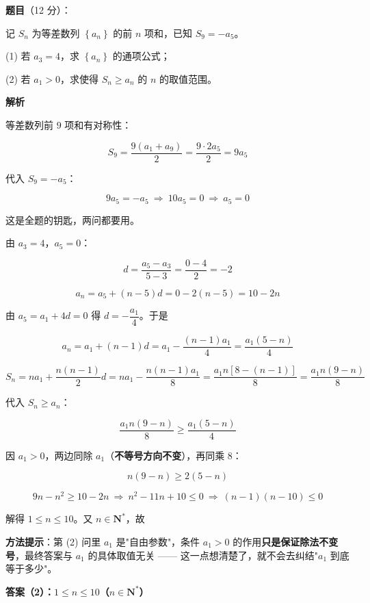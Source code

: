 \begin{answer}

\textbf{题目}（12 分）：

记 $S_n$ 为等差数列 $\left\{a_n\right\}$ 的前 $n$ 项和，已知 $S_9=-a_5$。

  (1) 若 $a_3=4$，求 $\left\{a_n\right\}$ 的通项公式；

  (2) 若 $a_1>0$，求使得 $S_n\ge a_n$ 的 $n$ 的取值范围。

\textbf{解析}


等差数列前 $9$ 项和有对称性：

\nopagebreak[4]
\[S_9=\frac{9\left(a_1+a_9\right)}2=\frac{9\cdot2a_5}2=9a_5\]

代入 $S_9=-a_5$：

\nopagebreak[4]
\[9a_5=-a_5\ \Longrightarrow\ 10a_5=0\ \Longrightarrow\ \boxed{a_5=0}\]

这是全题的钥匙，两问都要用。


由 $a_3=4$，$a_5=0$：

\nopagebreak[4]
\[d=\frac{a_5-a_3}{5-3}=\frac{0-4}2=-2\]

\nopagebreak[4]
\[a_n=a_5+(n-5)d=0-2(n-5)=10-2n\]


由 $a_5=a_1+4d=0$ 得 $d=-\dfrac{a_1}4$。于是

\nopagebreak[4]
\[a_n=a_1+(n-1)d=a_1-\frac{(n-1)a_1}4=\frac{a_1(5-n)}4\]

\nopagebreak[4]
\[S_n=na_1+\frac{n(n-1)}2d=na_1-\frac{n(n-1)a_1}8=\frac{a_1n\left[8-(n-1)\right]}8=\frac{a_1n(9-n)}8\]

代入 $S_n\ge a_n$：

\nopagebreak[4]
\[\frac{a_1n(9-n)}8\ge\frac{a_1(5-n)}4\]

因 $a_1>0$，两边同除 $a_1$（\textbf{不等号方向不变}），再同乘 $8$：

\nopagebreak[4]
\[n(9-n)\ge2(5-n)\]

\nopagebreak[4]
\[9n-n^{2}\ge10-2n\ \Longrightarrow\ n^{2}-11n+10\le0\ \Longrightarrow\ (n-1)(n-10)\le0\]

解得 $1\le n\le10$。又 $n\in\mathbf N^{*}$，故

\begin{gktip}
\textbf{方法提示}：第 (2) 问里 $a_1$ 是"自由参数"，条件 $a_1>0$ 的作用\textbf{只是保证除法不变号}，最终答案与 $a_1$ 的具体取值无关 —— 这一点想清楚了，就不会去纠结"$a_1$ 到底等于多少"。
\end{gktip}


\textbf{答案（2）：$1\le n\le10$（$n\in\mathbf N^{*}$）}

\par\medskip

\end{answer}
